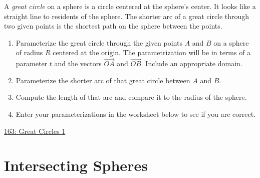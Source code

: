 \documentclass{ximera}
\begin{document}
\begin{question}  \label{Q9df7udsftr}
A \emph{great circle} on a sphere is a circle centered at the sphere's center. It looks like a straight line to residents of the sphere. The shorter arc of a great circle through two given points is the shortest path on the sphere between the points.

\begin{enumerate}
\item{Parameterize the great circle through the given points $A$ and $B$ on a sphere of radius $R$ centered at the origin. The parametrization will be in terms of a parameter $t$ and the vectors $\overrightarrow{OA}$ and $\overrightarrow{OB}$. Include an appropriate domain.}

\item{Parameterize the shorter arc of that great circle between $A$ and $B$.}
\item{Compute the length of that arc and compare it to the radius of the sphere.}
\item{Enter your parameterizations in the worksheet below to see if you are correct.}

\end{enumerate}

\begin{onlineOnly}
    \begin{center}
\end{center}
\end{onlineOnly}

\href{https://www.desmos.com/3d/vulzde8gww}{163: Great Circles 1}

\end{question}


\section{Intersecting Spheres}
\end{document}
